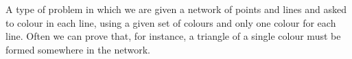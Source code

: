 A type of problem in which we are given a network of points and lines and 
asked to colour in each line, using a given set of colours and only one
colour for each line. Often we can prove that, for instance, a triangle of
a single colour must be formed somewhere in the network.
